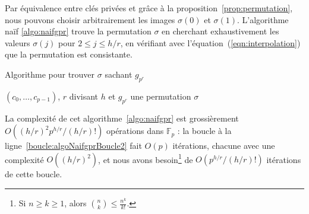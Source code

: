 \documentclass[a4paper, titlepage, 11pt]{article}
\theoremstyle{definition}
\theoremstyle{remark}
\def\O{O}
\def\gf #1{\mathbb{F}_{#1}}
\begin{document}
Par équivalence entre clés privées et grâce à la proposition~\ref{prop:permutation}, nous pouvons choisir arbitrairement les images $\sigma(0)$ et $\sigma(1)$. L'algorithme naïf \ref{algo:naifgpr} trouve la permutation $\sigma$ en cherchant exhaustivement les valeurs $\sigma(j)$ pour $2\leqslant j \leqslant h/r$, en vérifiant avec l'équation~(\ref{eqn:interpolation}) que la permutation est consistante.

\begin{algorithm}[h]
\caption{Algorithme pour trouver $\sigma$ sachant $g_{p^r}$}
\label{algo:naifgpr}
\begin{algorithmic}[1]
\REQUIRE $(c_0,\dots, c_{p-1})$, $r$ divisant $h$ et $g_{p^r}$
\ENSURE une permutation $\sigma$
 \label{boucle:algoNaifgprBoucle}
	 \label{boucle:algoNaifgprBoucle2}
		\ELSE
		\ENDIF
	\ENDFOR
	\RETURN{$\sigma$}
\ENDFOR
\end{algorithmic}
\end{algorithm}

La complexité de cet algorithme~\ref{algo:naifgpr} est grossièrement $\O((h/r)^2p^{h/r}/(h/r)!)$ opérations dans $\gf{p}$ : la boucle à la ligne~\ref{boucle:algoNaifgprBoucle2} fait $\O(p)$ itérations, chacune avec une complexité $\O((h/r)^2)$, et nous avons besoin\footnote{Si $n\geqslant k \geqslant 1$, alors $\binom{n}{k} \leqslant \frac{n^k}{k!}$.} de $\O(p^{h/r}/(h/r)!)$ itérations de cette boucle.
\end{document}
